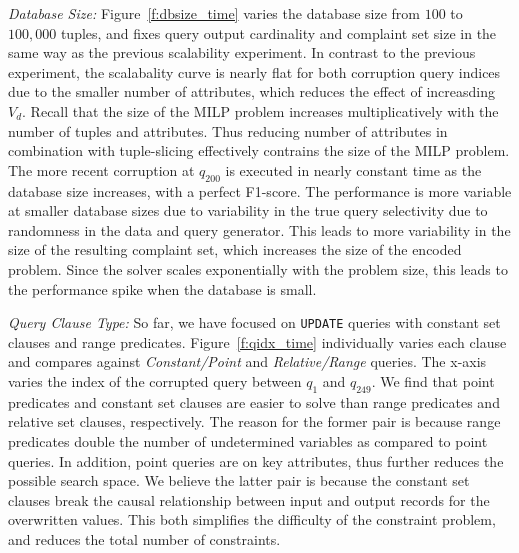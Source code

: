 \emph{Database Size:}
Figure~\ref{f:dbsize_time} varies the database size from $100$ to $100,000$ tuples, and fixes query output cardinality and complaint set size in the same way as the previous scalability experiment.
In contrast to the previous experiment, the scalabality curve is nearly flat for both corruption query indices due to the smaller number of attributes, which reduces the effect of increasding $V_d$.  
Recall that the size of the MILP problem increases multiplicatively with the number of tuples and attributes.  
Thus reducing number of attributes in combination with tuple-slicing effectively contrains the size of the MILP problem.
The more recent corruption at $q_{200}$ is executed in nearly constant time as the database size increases, with a perfect F1-score. 
The performance is more variable at smaller database sizes due to variability in the true query selectivity due to randomness in the data and query generator.
This leads to more variability in the size of the resulting complaint set, which increases the size of the encoded problem.
Since the solver scales exponentially with the problem size, this leads to the performance spike when the database is small.


\emph{Query Clause Type: }
So far, we have focused on \texttt{UPDATE} queries with constant set clauses and range predicates.  
Figure~\ref{f:qidx_time} individually varies each clause and compares against {\it Constant/Point} and {\it Relative/Range} queries. 
The x-axis varies the index of the corrupted query between $q_1$ and $q_{249}$.
We find that point predicates and constant set clauses are easier to solve than range predicates and relative set clauses, respectively.
The reason for the former pair is because range predicates double the number of undetermined variables as compared to point queries.  
In addition, point queries are on key attributes, thus further reduces the possible search space.  
We believe the latter pair is because the constant set clauses break the causal relationship between input and output records for the overwritten values.
This both simplifies the difficulty of the constraint problem, and reduces the total number of constraints.

